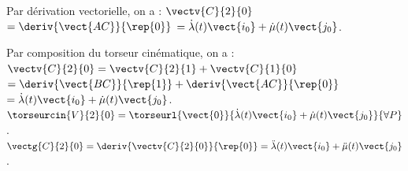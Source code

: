 \begin{corrigebox}
Par dérivation vectorielle, on a : $\vectv{C}{2}{0} $
$ = \deriv{\vect{AC}}{\rep{0}}$
$ = \dot{\lambda}(t)\vect{i_0}+\dot{\mu}(t)\vect{j_0}$.

Par composition du torseur cinématique, on a : 
$\vectv{C}{2}{0} = \vectv{C}{2}{1} +\vectv{C}{1}{0}$
$ = \deriv{\vect{BC}}{\rep{1}}+\deriv{\vect{AC}}{\rep{0}}$
$ = \dot{\lambda}(t)\vect{i_0}+\dot{\mu}(t)\vect{j_0}$.
$\torseurcin{V}{2}{0}= \torseurl{\vect{0}}{\dot{\lambda}(t)\vect{i_0}+\dot{\mu}(t)\vect{j_0}}{\forall P}$.
$\vectg{C}{2}{0} = \deriv{\vectv{C}{2}{0}}{\rep{0}}=\ddot{\lambda}(t)\vect{i_0}+\ddot{\mu}(t)\vect{j_0}$.
\end{corrigebox}
